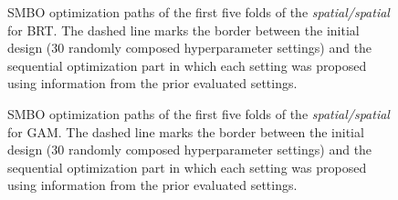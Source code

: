 \documentclass[review]{elsarticle}
\begin{document}
\begin{figure} [ht]
	\begin{center}
		\caption[]{SMBO optimization paths of the first five folds of the \emph{spatial/spatial} for \ac{BRT}. The dashed line marks the border between the initial design (30 randomly composed hyperparameter settings) and the sequential optimization part in which each setting was proposed using information from the prior evaluated settings.}
		\label{fig:optimization_paths_brt}
	\end{center}
\end{figure}

\begin{figure} [ht]
	\begin{center} 
		\caption[]{SMBO optimization paths of the first five folds of the \emph{spatial/spatial} for \ac{GAM}. The dashed line marks the border between the initial design (30 randomly composed hyperparameter settings) and the sequential optimization part in which each setting was proposed using information from the prior evaluated settings.}
		\label{fig:optimization_paths_gam}
	\end{center}
\end{figure}
\end{document}
